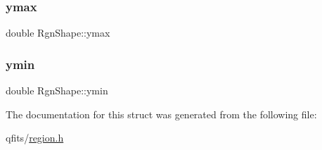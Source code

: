 \mbox{\label{struct_rgn_shape_af377f2e676b334da13dad00e0acf02b5}} 
\subsubsection{\texorpdfstring{ymax}{ymax}}
{\footnotesize\ttfamily double Rgn\+Shape\+::ymax}

\mbox{\label{struct_rgn_shape_a54b97535d6c93dd10580ba20bcdba50b}} 
\subsubsection{\texorpdfstring{ymin}{ymin}}
{\footnotesize\ttfamily double Rgn\+Shape\+::ymin}



The documentation for this struct was generated from the following file\+:\begin{DoxyCompactItemize}
\item 
qfits/\hyperlink{region_8h}{region.\+h}\end{DoxyCompactItemize}
